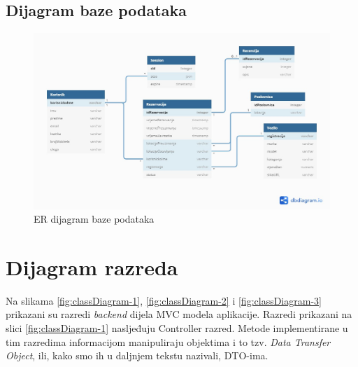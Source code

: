 			
			\newpage\subsection{Dijagram baze podataka}
			
			 \begin{figure}[hp]
                    \centering
                    \includegraphics[width=15cm]{slike/ER_dijagram.png}
                    \caption{ER dijagram baze podataka}
                    \label{fig:useCase-2}
                \end{figure}
			
			
		\newpage
		\section{Dijagram razreda}
			
			Na slikama \ref{fig:classDiagram-1}, \ref{fig:classDiagram-2} i \ref{fig:classDiagram-3} prikazani su razredi \textit{backend} dijela MVC modela aplikacije. Razredi prikazani na slici \ref{fig:classDiagram-1} nasljeđuju Controller razred. Metode implementirane u tim razredima informacijom manipuliraju objektima i to tzv. \textit{Data Transfer Object}, ili, kako smo ih u daljnjem tekstu nazivali, DTO-ima.\\
	
